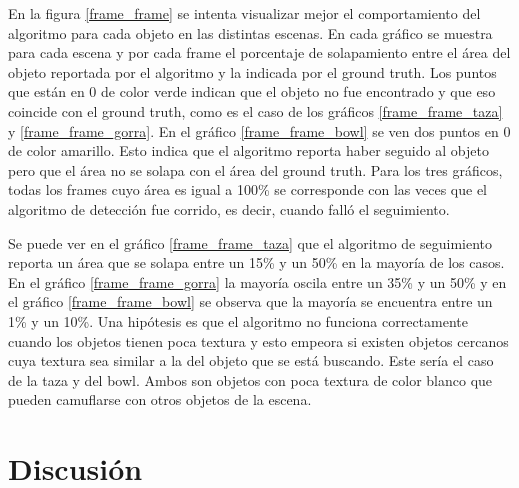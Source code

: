 En la figura \ref{frame_frame} se intenta visualizar mejor el comportamiento del algoritmo para cada objeto en las distintas escenas. En cada gráfico se muestra para cada escena y por cada frame el porcentaje de solapamiento entre el área del objeto reportada por el algoritmo y la indicada por el ground truth. Los puntos que están en 0 de color verde indican que el objeto no fue encontrado y que eso coincide con el ground truth, como es el caso de los gráficos \ref{frame_frame_taza} y \ref{frame_frame_gorra}. En el gráfico \ref{frame_frame_bowl} se ven dos puntos en 0 de color amarillo. Esto indica que el algoritmo reporta haber seguido al objeto pero que el área no se solapa con el área del ground truth. Para los tres gráficos, todas los frames cuyo área es igual a 100\% se corresponde con las veces que el algoritmo de detección fue corrido, es decir, cuando falló el seguimiento. 

Se puede ver en el gráfico \ref{frame_frame_taza} que el algoritmo de seguimiento reporta un área que se solapa entre un 15\% y un 50\% en la mayoría de los casos. En el gráfico \ref{frame_frame_gorra} la mayoría oscila entre un 35\% y un 50\% y en el gráfico \ref{frame_frame_bowl} se observa que la mayoría se encuentra entre un 1\% y un 10\%. Una hipótesis es que el algoritmo no funciona correctamente cuando los objetos tienen poca textura y esto empeora si existen objetos cercanos cuya textura sea similar a la del objeto que se está buscando. Este sería el caso de la taza y del bowl. Ambos son objetos con poca textura de color blanco que pueden camuflarse con otros objetos de la escena. 


\section{Discusión}